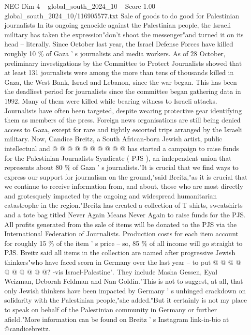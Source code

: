 \begin{textsample}{NEG Dim 4 – global\_south\_2024\_10 – Score 1.00 – global\_south\_2024\_10/116905577.txt}  \label{ex:f4_neg_069}
Sale of goods to do good for Palestinian journalists In its ongoing genocide against the Palestinian people, the Israeli military has taken the expression"don't shoot the messenger"and turned it on its head -- literally.
Since October last year, the Israel Defense Forces have killed roughly 10 \% of Gaza ' s journalists and media workers.
As of 28 October, preliminary investigations by the Committee to Protect Journalists showed that at least 131 journalists were among the more than tens of thousands killed in Gaza, the West Bank, Israel and Lebanon, since the war began.
This has been the deadliest period for journalists since the committee began gathering data in 1992.
Many of them were killed while bearing witness to Israeli attacks.
Journalists have often been targeted, despite wearing protective gear identifying them as members of the press.
Foreign news organisations are still being denied access to Gaza, except for rare and tightly escorted trips arranged by the Israeli military.
Now, Candice Breitz, a South African-born Jewish artist, public intellectual and @ @ @ @ @ @ @ @ @ @ has started a campaign to raise funds for the Palestinian Journalists Syndicate ( PJS ), an independent union that represents about 80 \% of Gaza ' s journalists."It is crucial that we find ways to express our support for journalism on the ground,"said Breitz,"as it is crucial that we continue to receive information from, and about, those who are most directly and grotesquely impacted by the ongoing and widespread humanitarian catastrophe in the region."Breitz has created a collection of T-shirts, sweatshirts and a tote bag titled Never Again Means Never Again to raise funds for the PJS.
All profits generated from the sale of items will be donated to the PJS via the International Federation of Journalists.
Production costs for each item account for roughly 15 \% of the item ' s price -- so, 85 \% of all income will go straight to PJS.
Breitz said all items in the collection are named after progressive Jewish thinkers"who have faced scorn in Germany over the last year -- to put @ @ @ @ @ @ @ @ @ @? -vis Israel-Palestine".
They include Masha Gessen, Eyal Weizman, Deborah Feldman and Nan Goldin."This is not to suggest, at all, that only Jewish thinkers have been impacted by Germany ' s unhinged crackdown on solidarity with the Palestinian people,"she added."But it certainly is not my place to speak on behalf of the Palestinian community in Germany or further afield."More information can be found on Breitz ' s Instagram link-in-bio at @candicebreitz.

\end{textsample}
